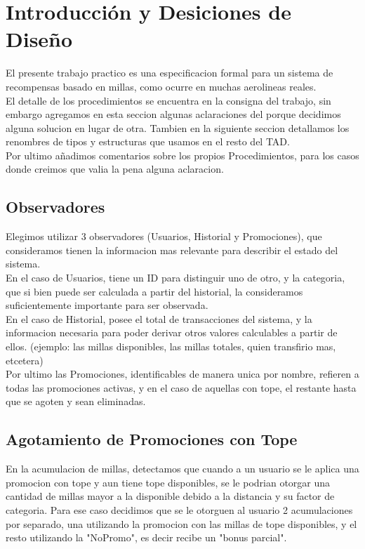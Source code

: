 \documentclass[11pt,a4paper]{article}
\begin{document}
\maketitle
\section{Introducción y Desiciones de Diseño}
El presente trabajo practico es una especificacion formal para un sistema de recompensas basado en millas, como ocurre en muchas aerolineas reales.\\
El detalle de los procedimientos se encuentra en la consigna del trabajo, sin embargo agregamos en esta seccion algunas aclaraciones del porque decidimos alguna solucion en lugar de otra. Tambien en la siguiente seccion detallamos los renombres de tipos y estructuras que usamos en el resto del TAD.\\
Por ultimo añadimos comentarios sobre los propios Procedimientos, para los casos donde creimos que valia la pena alguna aclaracion.\\

\subsection{Observadores}
Elegimos utilizar 3 observadores (Usuarios, Historial y Promociones), que consideramos tienen la informacion mas relevante para describir el estado del sistema.\\
En el caso de Usuarios, tiene un ID para distinguir uno de otro, y la categoria, que si bien puede ser calculada a partir del historial, la consideramos suficientemente importante para ser observada.\\
En el caso de Historial, posee el total de transacciones del sistema, y la informacion necesaria para poder derivar otros valores calculables a partir de ellos. (ejemplo: las millas disponibles, las millas totales, quien transfirio mas, etcetera)\\
Por ultimo las Promociones, identificables de manera unica por nombre, refieren a todas las promociones activas, y en el caso de aquellas con tope, el restante hasta que se agoten y sean eliminadas.

\subsection{Agotamiento de Promociones con Tope}
En la acumulacion de millas, detectamos que cuando a un usuario se le aplica una promocion con tope y aun tiene tope disponibles, se le podrian otorgar una cantidad de millas mayor a la disponible debido a la distancia y su factor de categoria. Para ese caso decidimos que se le otorguen al usuario 2 acumulaciones por separado, una utilizando la promocion con las millas de tope disponibles, y el resto utilizando la "NoPromo", es decir recibe un "bonus parcial".
\end{document}
